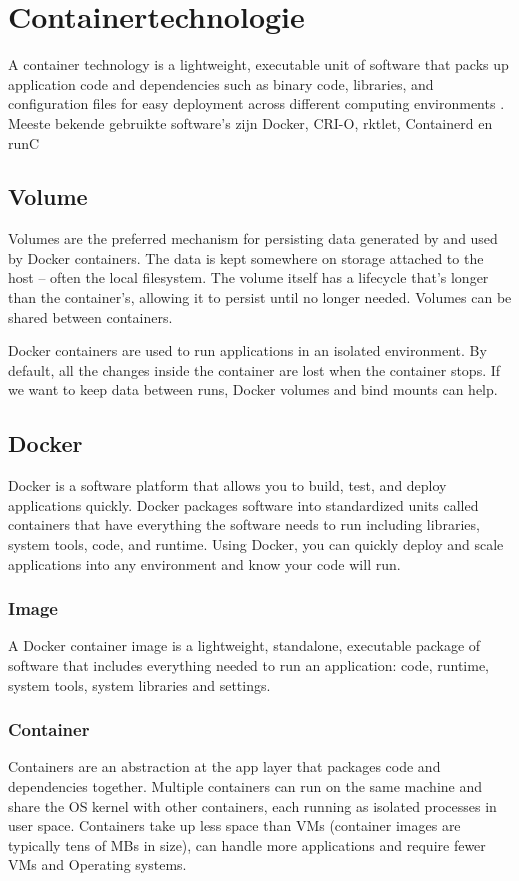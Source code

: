 \section{Containertechnologie}
A container technology is a lightweight, executable unit of software that packs up application code and dependencies such as binary code, libraries, and configuration files for easy deployment across different computing environments \autocite{Solarwinds2023}.
Meeste bekende gebruikte software's zijn Docker, CRI-O, rktlet, Containerd en runC

\subsection{Volume}
Volumes are the preferred mechanism for persisting data generated by and used by Docker containers.
The data is kept somewhere on storage attached to the host – often the local filesystem. The volume itself has a lifecycle that's longer than the container's, allowing it to persist until no longer needed. Volumes can be shared between containers. \autocite{Javatpoint2023}

Docker containers are used to run applications in an isolated environment. By default, all the changes inside the container are lost when the container stops. If we want to keep data between runs, Docker volumes and bind mounts can help. \autocite{Frieze2022}

\subsection{Docker}
Docker is a software platform that allows you to build, test, and deploy applications quickly. Docker packages software into standardized units called containers that have everything the software needs to run including libraries, system tools, code, and runtime. Using Docker, you can quickly deploy and scale applications into any environment and know your code will run. \autocite{AwsAmazon2023}

\subsubsection{Image}
A Docker container image is a lightweight, standalone, executable package of software that includes everything needed to run an application: code, runtime, system tools, system libraries and settings.\autocite{Docker2023a}

\subsubsection{Container}
Containers are an abstraction at the app layer that packages code and dependencies together. Multiple containers can run on the same machine and share the OS kernel with other containers, each running as isolated processes in user space. Containers take up less space than VMs (container images are typically tens of MBs in size), can handle more applications and require fewer VMs and Operating systems.\autocite{Docker2023a}

